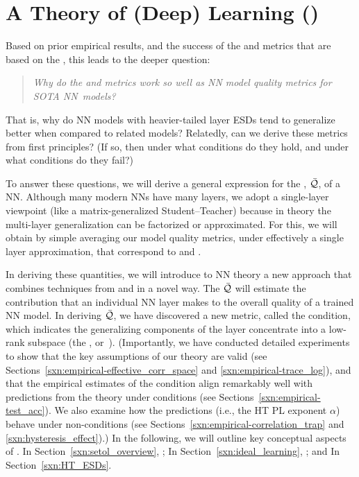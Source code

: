 \section{A \SemiEmpirical Theory of (Deep) Learning (\SETOL)}
\label{sxn:setol}
Based on prior empirical results, and the success of the \ALPHA and \ALPHAHAT metrics that are based on the \HTSR \Phenomenology, this leads to the deeper question: 
%
\begin{quote}
\emph{Why do the \ALPHA and \ALPHAHAT metrics work so well as NN model quality metrics for SOTA NN~models?}
\end{quote}
That is, why do NN models with heavier-tailed layer ESDs tend to generalize better when compared to related models?
Relatedly, can we derive these metrics from first principles?
(If so, then under what conditions do they hold, and under what conditions do they fail?)


\noindent
To answer these questions, we will derive a general expression for the \LayerQuality, $\bar{\mathcal{Q}}$, of a NN.
Although many modern NNs have many layers, we adopt a single-layer viewpoint (like a matrix-generalized Student–Teacher) because in \SMOG theory the multi-layer generalization can be factorized or approximated.
For this, we will obtain by simple averaging our model quality metrics, under effectively a single layer approximation, that correspond to \ALPHA and \ALPHAHAT.


In deriving these quantities, we will introduce to NN theory a new \SemiEmpirical approach that combines techniques from \STATMECH and \RMT in a novel way.
The \LayerQuality $\bar{\mathcal{Q}}$ will estimate the contribution that an individual NN layer makes to the overall quality of a trained NN model.
In deriving $\bar{\mathcal{Q}}$, we have discovered a new \LayerQuality metric, called the \TRACELOG condition,
which indicates the generalizing components of the layer concentrate into a low-rank subspace
(the \emph{\EffectiveCorrelationSpace}, or~\ECS).
%
(Importantly, we have conducted detailed experiments to show that the key assumptions of our \SETOL theory are valid
(see Sections~\ref{sxn:empirical-effective_corr_space} and \ref{sxn:empirical-trace_log}),
and that the empirical estimates of the \SETOL \TRACELOG condition align remarkably well with predictions from the \HTSR
theory under \Ideal conditions (see Sections~\ref{sxn:empirical-test_acc}).
We also examine how the \HTSR predictions (i.e., the HT PL exponent $\alpha$) behave under non-\Ideal conditions (see Sections~\ref{sxn:empirical-correlation_trap} and \ref{sxn:hysteresis_effect}).)
%
In the following, we will outline key conceptual aspects of \SETOL.
In Section~\ref{sxn:setol_overview}, ;
In Section~\ref{sxn:ideal_learning}, ; and
In Section~\ref{sxn:HT_ESDs}.






